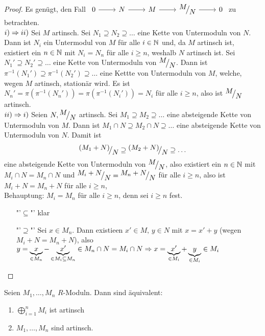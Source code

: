 \begin{proof}
	Es genügt, den Fall $\begin{tikzcd}
	0 \arrow{r} & N \arrow{r} & M\arrow{r} & \QR{M}{N} \arrow{r} & 0
	\end{tikzcd}$ zu betrachten.\\
	$i) \Rightarrow ii)$ Sei $M$ artinsch. Sei $N_1 \supseteq N_2 \supseteq \ldots$ eine Kette von Untermoduln von $N$. Dann ist $N_i$ ein Untermodul von $M$ für alle $i\in \mathbb{N}$ und, da $M$ artinsch ist, existiert ein $n\in \mathbb{N}$ mit $N_i = N_n$ für alle $i\geq n$, weshalb $N$ artinsch ist. Sei $N_1' \supseteq N_2'\supseteq \ldots$ eine Kette von Untermoduln von $\QR{M}{N}$. Dann ist $\pi^{-1}(N_1') \supseteq \pi^{-1}(N_2') \supseteq \ldots$ eine Kettte von Untermoduln von $M$, welche, wegen $M$ artinsch, stationär wird. Es ist $N_n' = \pi (\pi^{-1}(N_n')) = \pi(\pi^{-1}(N_i')) = N_i$ für alle $i\geq n$, also ist $\QR{M}{N}$ artinsch.\\
	$ii) \Rightarrow i)$ Seien $N, \QR{M}{N}$ artinsch. Sei $M_1 \supseteq M_2 \supseteq \ldots$ eine absteigende Kette von Untermoduln von $M$. Dann ist $M_1 \cap N \supseteq M_2 \cap N \supseteq \ldots$ eine absteigende Kette von Untermoduln von $N$. Damit ist 
	$$\QR{(M_1+N)}{N} \supseteq \QR{(M_2+N)}{N} \supseteq \ldots$$
	eine absteigende Kette von Untermoduln von $\QR{M}{N}$, also existiert ein $n\in \mathbb{N}$ mit $M_i \cap N = M_n \cap N$ und $\QR{M_i + N}{N} = \QR{M_n+N}{N} $ für alle $i\geq n$, also ist $M_i + N = M_n + N$ für alle $i\geq n$, \\
	Behauptung: $M_i = M_n$ für alle $i\geq n$, denn sei $i\geq n$ fest. 
	\begin{enumerate}
		\item["'$\subseteq$"'] klar
		\item["'$\supseteq$"'] Sei $x\in M_n$. Dann existieen $x' \in M, \, y\in N$ mit $x = x' + y$ (wegen $M_i + N = M_n + N$), also $y= \underbrace{x}_{\in M_n} - \underbrace{x'}_{\in M_i \subseteq M_n} \in M_n \cap N = M_i \cap N \Rightarrow  x= \underbrace{x'}_{\in M_i} + \underbrace{y}_{\in M_i} \in M_i$ 
	\end{enumerate}
\end{proof}
\begin{fo}\label{3.18}
	Seien $M_1, \ldots, M_n$ $R$-Moduln. Dann sind äquivalent:
	\begin{enumerate}[label= \roman*)]
		\item $\bigoplus_{i=1}^n M_i$ ist artinsch
		\item $M_1, \ldots, M_n$ sind artinsch.
	\end{enumerate}
\end{fo}
